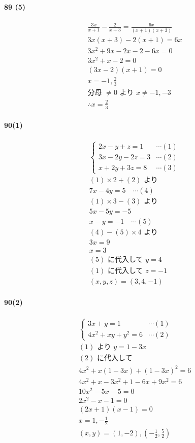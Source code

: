\documentclass[fleqn,a4j,dvipdfmx,uplatex,twocolumn]{jsarticle}
\begin{document}
\paragraph{89 (5)}
\begin{align*}
  &\frac{3 x}{x+1}-\frac{2}{x+3}=\frac{6 x}{(x+1)(x+3)} \\
  &3 x(x+3)-2(x+1)=6 x \\
  &3 x^{2}+9 x-2 x-2-6 x=0 \\
  &3 x^{2}+x-2=0 \\
  &(3 x-2)(x+1)=0 \\
  &x=-1, \frac{2}{3} \\
  &\text{分母 } \neq 0 \text{ より } x \neq -1, -3 \\
  &\therefore x=\frac{2}{3}
\end{align*}

\paragraph{90(1)}
\begin{align*}
  &\begin{cases} 2x-y+z=1 & \cdots (1) \\ 3x-2y-2z=3 & \cdots (2) \\ x+2y+3z=8 & \cdots (3) \end{cases} \\
  &(1)\times 2 + (2) \text{ より} \\
  &7x-4y=5 \quad \cdots (4) \\
  &(1)\times 3 - (3) \text{ より} \\
  &5x-5y=-5 \\
  &x-y=-1 \quad \cdots (5) \\
  &(4) - (5)\times 4 \text{ より} \\
  &3x=9 \\
  &x=3 \\
  &(5) \text{ に代入して } y=4 \\
  &(1) \text{ に代入して } z=-1 \\
  &(x, y, z)=(3, 4, -1)
\end{align*}

\paragraph{90(2)}
\begin{align*}
  &\begin{cases} 3x+y=1 & \cdots (1) \\ 4x^{2}+xy+y^{2}=6 & \cdots (2) \end{cases} \\
  &(1) \text{ より } y=1-3x \\
  &(2) \text{ に代入して} \\
  &4x^{2}+x(1-3x)+(1-3x)^{2}=6 \\
  &4x^{2}+x-3x^{2}+1-6x+9x^{2}=6 \\
  &10x^{2}-5x-5=0 \\
  &2x^{2}-x-1=0 \\
  &(2x+1)(x-1)=0 \\
  &x=1, -\frac{1}{2} \\
  &(x, y)=(1, -2), \left(-\frac{1}{2}, \frac{5}{2}\right)
\end{align*}
\end{document}
